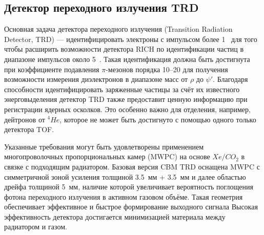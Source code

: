 \subsection{Детектор переходного излучения TRD}\label{sec:secTRD}


Основная задача детектора переходного излучения (Transition Radiation Detector, TRD) --- идентифицировать электроны с импульсом более 1~\GeVoverC{} для того чтобы расширить возможности детектора RICH по идентификации частиц в диапазоне импульсов около 5~\GeVoverC{}.
Такая идентификация должна быть достигнута при коэффициенте подавления $\pi$-мезонов порядка 10--20 для получения возможности измерения диэлектронов в диапазоне масс от $\rho$ до $\psi'$.
Благодаря способности идентифицировать заряженные частицы за счёт их известного энерговыделения детектор TRD также предоставит ценную информацию при регистрации ядерных осколков.
Это особенно важно для отделения, например, дейтронов от $ ^{4}He $, которое не может быть достигнуто с помощью одного только детектора TOF.


Указанные требования могут быть удовлетворены применением многопроволочных пропорциональных камер (MWPC) на основе $ Xe/CO_{2} $ в связке с подходящим радиатором. Базовая версия CBM TRD оснащена MWPC с симметричной зоной усиления толщиной 3.5~мм + 3.5~мм и далее областью дрейфа толщиной 5~мм, наличие которой увеличивает вероятность поглощения фотона переходного излучения в активном газовом объёме. Такая геометрия обеспечивает эффективное и быстрое формирование выходного сигнала
Высокая эффективность детектора достигается минимизацией материала между радиатором и газом.

